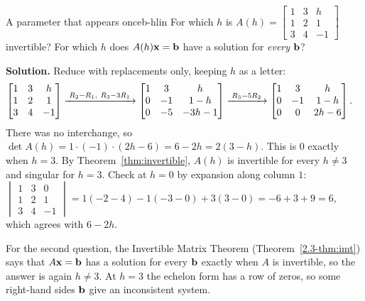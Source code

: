 \documentclass[11pt]{article}
\begin{document}
\begin{exmp}{A parameter that appears once}{b-hlin}
For which $h$ is $A(h)=\begin{bmatrix}1&3&h\\1&2&1\\3&4&-1\end{bmatrix}$ invertible? For which $h$ does $A(h)\mathbf{x}=\mathbf{b}$ have a solution for \emph{every} $\mathbf{b}$?

\textbf{Solution.} Reduce with replacements only, keeping $h$ as a letter:
\begin{align*}
\begin{bmatrix}1&3&h\\1&2&1\\3&4&-1\end{bmatrix}
&\xrightarrow{\;R_2-R_1,\ R_3-3R_1\;}
\begin{bmatrix}1&3&h\\0&-1&1-h\\0&-5&-3h-1\end{bmatrix}
\xrightarrow{\;R_3-5R_2\;}
\begin{bmatrix}1&3&h\\0&-1&1-h\\0&0&2h-6\end{bmatrix}
.
\end{align*}
There was no interchange, so $\det A(h)=1\cdot(-1)\cdot(2h-6)=6-2h=2(3-h)$. This is $0$ exactly when $h=3$. By Theorem~\ref{thm:invertible}, $A(h)$ is invertible for every $h\neq3$ and singular for $h=3$. Check at $h=0$ by expansion along column $1$: $\begin{vmatrix}1&3&0\\1&2&1\\3&4&-1\end{vmatrix}=1(-2-4)-1(-3-0)+3(3-0)=-6+3+9=6$, which agrees with $6-2h$.

For the second question, the Invertible Matrix Theorem (Theorem~\ref{2.3-thm:imt}) says that $A\mathbf{x}=\mathbf{b}$ has a solution for every $\mathbf{b}$ exactly when $A$ is invertible, so the answer is again $h\neq3$. At $h=3$ the echelon form has a row of zeros, so some right-hand sides $\mathbf{b}$ give an inconsistent system.
\end{exmp}
\end{document}
